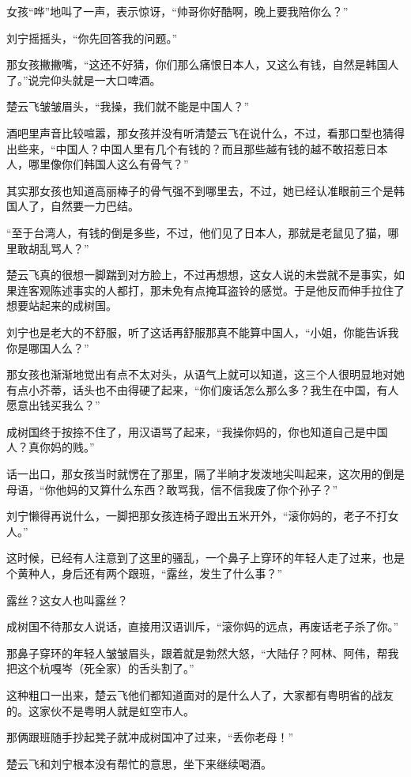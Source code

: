 女孩“哗”地叫了一声，表示惊讶，“帅哥你好酷啊，晚上要我陪你么？”

刘宁摇摇头，“你先回答我的问题。”

那女孩撇撇嘴，“这还不好猜，你们那么痛恨日本人，又这么有钱，自然是韩国人了。”说完仰头就是一大口啤酒。

楚云飞皱皱眉头，“我操，我们就不能是中国人？”

酒吧里声音比较喧嚣，那女孩并没有听清楚云飞在说什么，不过，看那口型也猜得出些来，“中国人？中国人里有几个有钱的？而且那些越有钱的越不敢招惹日本人，哪里像你们韩国人这么有骨气？”

其实那女孩也知道高丽棒子的骨气强不到哪里去，不过，她已经认准眼前三个是韩国人了，自然要一力巴结。

“至于台湾人，有钱的倒是多些，不过，他们见了日本人，那就是老鼠见了猫，哪里敢胡乱骂人？”

楚云飞真的很想一脚踹到对方脸上，不过再想想，这女人说的未尝就不是事实，如果连客观陈述事实的人都打，那未免有点掩耳盗铃的感觉。于是他反而伸手拉住了想要站起来的成树国。

刘宁也是老大的不舒服，听了这话再舒服那真不能算中国人，“小姐，你能告诉我你是哪国人么？”

那女孩也渐渐地觉出有点不太对头，从语气上就可以知道，这三个人很明显地对她有点小芥蒂，话头也不由得硬了起来，“你们废话怎么那么多？我生在中国，有人愿意出钱买我么？”

成树国终于按捺不住了，用汉语骂了起来，“我操你妈的，你也知道自己是中国人？真你妈的贱。”

话一出口，那女孩当时就愣在了那里，隔了半晌才发泼地尖叫起来，这次用的倒是母语，“你他妈的又算什么东西？敢骂我，信不信我废了你个孙子？”

刘宁懒得再说什么，一脚把那女孩连椅子蹬出五米开外，“滚你妈的，老子不打女人。”

这时候，已经有人注意到了这里的骚乱，一个鼻子上穿环的年轻人走了过来，也是个黄种人，身后还有两个跟班，“露丝，发生了什么事？”

露丝？这女人也叫露丝？

成树国不待那女人说话，直接用汉语训斥，“滚你妈的远点，再废话老子杀了你。”

那鼻子穿环的年轻人皱皱眉头，跟着就是勃然大怒，“大陆仔？阿林、阿伟，帮我把这个杭嘎岑（死全家）的舌头割了。”

这种粗口一出来，楚云飞他们都知道面对的是什么人了，大家都有粤明省的战友的。这家伙不是粤明人就是虹空市人。

那俩跟班随手抄起凳子就冲成树国冲了过来，“丢你老母！”

楚云飞和刘宁根本没有帮忙的意思，坐下来继续喝酒。

